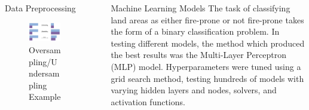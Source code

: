 \documentclass[final]{beamer}
\newlength{\sepwidth}
\newlength{\colwidth}
\newcommand{\separatorcolumn}{\begin{column}{\sepwidth}\end{column}}
\begin{document}
\begin{frame}[t]
\begin{columns}[t]
\begin{column}{\colwidth}
\begin{block}{Data Preprocessing}
\begin{figure}
\begin{minipage}{0.5\textwidth}
            \includegraphics[width=0.95\textwidth]{images/UnderOver.jpeg}
            \caption{Oversampling/Undersampling Example}
            \label{fig:wind.png}
        \end{minipage}
    \end{figure}
    
  \end{block}

\end{column}

\separatorcolumn

\begin{column}{\colwidth}

  \begin{exampleblock}{Machine Learning Models}
    The task of classifying land areas as either fire-prone or not fire-prone takes the form of a binary classification problem. In testing different models, the method which produced the best results was the Multi-Layer Perceptron (MLP) model. Hyperparameters were tuned using a grid search method, testing hundreds of models with varying hidden layers and nodes, solvers, and activation functions. 
    

\end{exampleblock}
\end{column}
\end{columns}
\end{frame}
\end{document}
